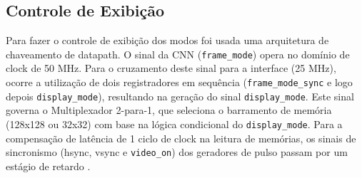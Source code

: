 \subsection{Controle de Exibição}
Para fazer o controle de exibição dos modos foi usada uma arquitetura de chaveamento de datapath. O sinal da CNN (\texttt{frame\_mode}) opera no domínio de clock de 50 MHz. Para o cruzamento deste sinal para a interface (25 MHz), ocorre a utilização de dois registradores em sequência (\texttt{frame\_mode\_sync} e logo depois \texttt{display\_mode}), resultando na geração do sinal \texttt{display\_mode}. Este sinal governa o Multiplexador 2-para-1, que seleciona o barramento de memória (128x128 ou 32x32) com base na lógica condicional do \texttt{display\_mode}. Para a compensação de latência de 1 ciclo de clock na leitura de memórias, os sinais de sincronismo (hsync, vsync e \texttt{video\_on}) dos geradores de pulso passam por um estágio de retardo .